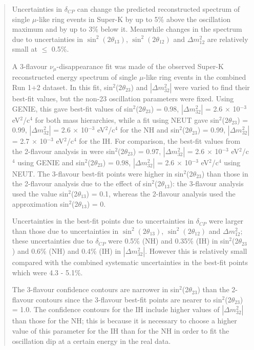 \begin{frontmatter}
\begin{abstract}
Uncertainties in $\delta_{CP}$ can change the predicted reconstructed spectrum of single $\mu$-like ring events
in Super-K by up to 5\% above the oscillation maximum and by up to 3\% below it. Meanwhile changes
in the spectrum due to uncertainties in $\sin^{2}(2 \theta_{13})$, $\sin^{2}(2 \theta_{12})$ and $\Delta m_{12}^{2}$ 
are relatively small at $\leq$ 0.5\%.

A 3-flavour $\nu_{\mu}$-disappearance fit was made of the observed Super-K reconstructed energy spectrum of
single $\mu$-like ring events in the combined Run 1+2 dataset. In this fit, sin$^{2}$(2$\theta_{23}$) and
$|\Delta m^{2}_{32}|$ were varied to find their best-fit values, but the non-23 oscillation parameters were
fixed. Using GENIE, this gave best-fit values of
sin$^{2}$(2$\theta_{23}$) = 0.98, $|\Delta m^{2}_{32}|$ = 2.6 $\times$ 10$^{-3}$ eV$^{2}$/c$^{4}$ for both mass
hierarchies, while a fit using NEUT gave sin$^{2}$(2$\theta_{23}$) = 0.99, $|\Delta m^{2}_{32}|$
= 2.6 $\times$ 10$^{-3}$ eV$^{2}$/c$^{4}$ for the NH and sin$^{2}$(2$\theta_{23}$) = 0.99, $|\Delta m^{2}_{32}|$
= 2.7 $\times$ 10$^{-3}$ eV$^{2}$/c$^{4}$ for the IH. For comparison, the best-fit values from the 2-flavour
analysis in \cite{OurRun1and2Analysis2F} were sin$^{2}$(2$\theta_{23}$) = 0.97, $|\Delta m^{2}_{32}|$
= 2.6 $\times$ 10$^{-3}$ eV$^{2}$/c$^{4}$ using GENIE and sin$^{2}$(2$\theta_{23}$) = 0.98, $|\Delta m^{2}_{32}|$
= 2.6 $\times$ 10$^{-3}$ eV$^{2}$/c$^{4}$ using NEUT. The 3-flavour best-fit points were higher in sin$^{2}$(2$\theta_{23}$)
than those in the 2-flavour analysis due to the effect of sin$^{2}$(2$\theta_{13}$): the 3-flavour analysis
used the value sin$^{2}$(2$\theta_{13}$) = 0.1, whereas the 2-flavour analysis used the approximation 
sin$^{2}$(2$\theta_{13}$) = 0.

Uncertainties in the best-fit points due to uncertainties in $\delta_{CP}$ were larger than those due to
uncertainties in $\sin^{2}(2 \theta_{13})$, $\sin^{2}(2 \theta_{12})$ and $\Delta m_{12}^{2}$; these uncertainties 
due to $\delta_{CP}$ were 0.5\% (NH) and 0.35\% (IH) in sin$^{2}$(2$\theta_{23}$) and 0.6\% (NH) and 0.4\% (IH) in
$|\Delta m^{2}_{32}|$. However this is relatively small compared with the combined systematic uncertainties in
the best-fit points which were 4.3 - 5.1\%.

The 3-flavour confidence contours are narrower in sin$^{2}$(2$\theta_{23}$) than the 2-flavour contours
since the 3-flavour best-fit points are nearer to sin$^{2}$(2$\theta_{23}$) = 1.0. The confidence contours
for the IH include higher values of $|\Delta m^{2}_{32}|$ than those for the NH; this is because it is necessary
to choose a higher value of this parameter for the IH than for the NH in order to fit the oscillation dip at a
certain energy in the real data.

\end{abstract}

%
%


\end{frontmatter}

\clearpage

\tableofcontents

\clearpage

\listoffigures
\listoftables


